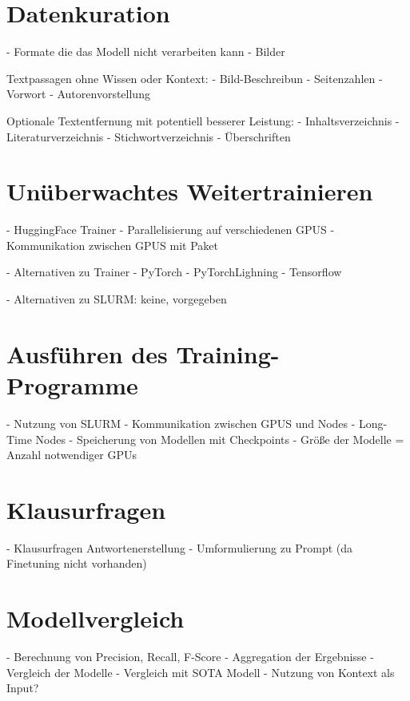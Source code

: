 \section{Datenkuration}

- Formate die das Modell nicht verarbeiten kann
    - Bilder

Textpassagen ohne Wissen oder Kontext:
    - Bild-Beschreibun
    - Seitenzahlen
    - Vorwort
    - Autorenvorstellung

Optionale Textentfernung mit potentiell besserer Leistung:
    - Inhaltsverzeichnis
    - Literaturverzeichnis
    - Stichwortverzeichnis
    - Überschriften

\section{Unüberwachtes Weitertrainieren}
- HuggingFace Trainer
- Parallelisierung auf verschiedenen GPUS
- Kommunikation zwischen GPUS mit Paket

- Alternativen zu Trainer
    - PyTorch
    - PyTorchLighning
    - Tensorflow

- Alternativen zu SLURM: keine, vorgegeben

\section{Ausführen des Training-Programme}
- Nutzung von SLURM
- Kommunikation zwischen GPUS und Nodes
- Long-Time Nodes
- Speicherung von Modellen mit Checkpoints
- Größe der Modelle = Anzahl notwendiger GPUs

\section{Klausurfragen}
- Klausurfragen Antwortenerstellung
- Umformulierung zu Prompt (da Finetuning nicht vorhanden)

\section{Modellvergleich}
- Berechnung von Precision, Recall, F-Score
- Aggregation der Ergebnisse
- Vergleich der Modelle
- Vergleich mit SOTA Modell
    - Nutzung von Kontext als Input?

